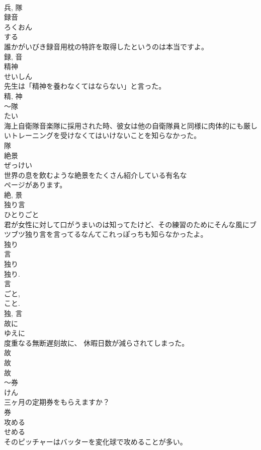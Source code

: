 \documentclass[8pt]{extreport}
\begin{document}
\begin{CJK}{UTF8}{min}
\\	兵, 隊	
\\	録音	
\\	ろくおん	
\\	する 
\\	誰かがいびき録音用枕の特許を取得したというのは本当ですよ。	
\\	録, 音	
\\	精神	
\\	せいしん	
\\	先生は「精神を養わなくてはならない」と言った。	
\\	精, 神	
\\	〜隊	
\\	たい	
\\	海上自衛隊音楽隊に採用された時、彼女は他の自衛隊員と同様に肉体的にも厳しいトレーニングを受けなくてはいけないことを知らなかった。	
\\	隊	
\\	絶景	
\\	ぜっけい	
\\	世界の息を飲むような絶景をたくさん紹介している有名な
\\	ページがあります。	
\\	絶, 景	
\\	独り言	
\\	ひとりごと	
\\	君が女性に対して口がうまいのは知ってたけど、その練習のためにそんな風にブツブツ独り言を言ってるなんてこれっぽっちも知らなかったよ。	
\\	独り 
\\	言 
\\	独り 
\\	独り. 
\\	言 
\\	ごと, 
\\	こと. 
\\	独, 言	
\\	故に	
\\	ゆえに	
\\	度重なる無断遅刻故に、 休暇日数が減らされてしまった。	
\\	故 
\\	故 
\\	故	
\\	〜券	
\\	けん	
\\	三ヶ月の定期券をもらえますか？	
\\	券	
\\	攻める	
\\	せめる	
\\	そのピッチャーはバッターを変化球で攻めることが多い。	

\end{CJK}
\end{document}
